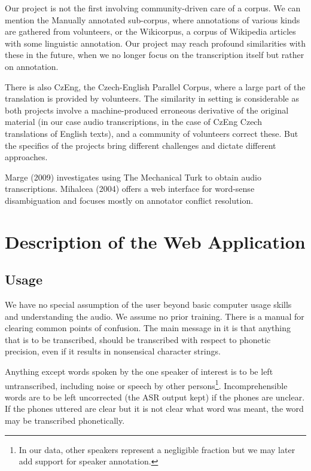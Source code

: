 \documentclass{svproc}
\begin{document}
Our project is not the first involving community-driven care of a corpus. We
can mention the Manually annotated sub-corpus\cite{ide2010manually}, where
annotations of various kinds are gathered from volunteers, or the
Wikicorpus\cite{reese2010wikicorpus}, a corpus of Wikipedia articles with some
linguistic annotation. Our project may reach profound similarities with these in
the future, when we no longer focus on the transcription itself but rather on
annotation.

There is also CzEng\cite{bojar2008czeng}, the Czech-English Parallel
Corpus, where a large part of the translation is provided by volunteers. The
similarity in setting is considerable as both projects involve a
machine-produced erroneous derivative of the original material (in our case
audio transcriptions, in the case of CzEng Czech translations of English texts),
and a community of volunteers correct these. But the specifics of the projects
bring different challenges and dictate different approaches.

Marge (2009)\cite{5494979} investigates using The Mechanical Turk to obtain
audio transcriptions. Mihalcea (2004)\cite{mihalcea2004building} offers a web
interface for word-sense disambiguation and focuses mostly on annotator conflict
resolution.

\section{Description of the Web Application}

\subsection{Usage}

We have no special assumption of the user beyond basic computer usage skills and
understanding the audio. We assume no prior training. There is a manual for
clearing common points of confusion. The main message in it is that anything
that is to be transcribed, should be transcribed with respect to
phonetic precision, even if it results in nonsensical character strings.

Anything except words spoken by the one speaker of interest is to be left
untranscribed, including noise or speech by other persons\footnote{In our data,
other speakers represent a negligible fraction but we may later add support for
speaker annotation.}. Incomprehensible words are to be left uncorrected
(the ASR output kept) if the phones are unclear. If the phones uttered are clear
but it is not clear what word was meant, the word may be transcribed
phonetically.
\end{document}
